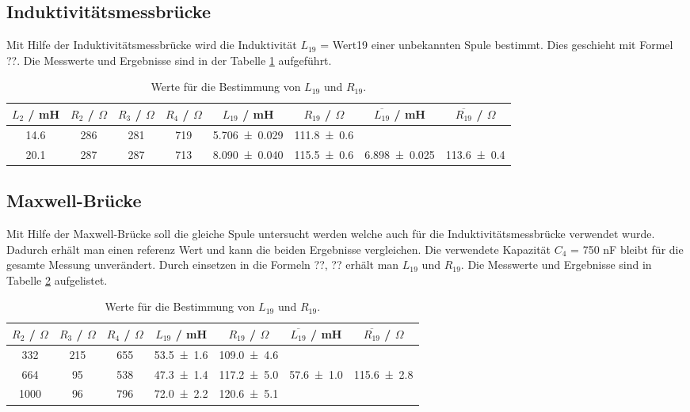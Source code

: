 \subsection{Induktivitätsmessbrücke}
Mit Hilfe der Induktivitätsmessbrücke wird die Induktivität $L_{19}$ = Wert19 einer unbekannten Spule bestimmt. Dies geschieht mit Formel ??. Die Messwerte und Ergebnisse sind in der Tabelle \ref{tab:Induk1} aufgeführt.
\begin{table}[H]
  \centering
  \begin{tabular}{c c c c c c c c}
    \toprule
    $L_2$ / mH & $R_2$ / $\Omega$ & $R_3$ / $\Omega$ & $R_4$ / $\Omega$ & $L_{19}$ / mH & $R_{19}$ / $\Omega$ & $\overline{L_{19}}$ / mH & $\overline{R_{19}}$ / $\Omega$ \\
    \midrule
    14.6 & 286 & 281 & 719 & \num{5.706 +- 0.029} & \num{111.8 +- 0.6} & & \\
    20.1 & 287 & 287 & 713 & \num{8.090 +- 0.040} & \num{115.5 +- 0.6} & \num{6.898 +- 0.025} & \num{113.6 +- 0.4} \\
  \end{tabular}
  \caption{Werte für die Bestimmung von $L_{19}$ und $R_{19}$.}
  \label{tab:Induk1}
\end{table}

\subsection{Maxwell-Brücke}
Mit Hilfe der Maxwell-Brücke soll die gleiche Spule untersucht werden welche auch für die Induktivitätsmessbrücke verwendet wurde. Dadurch erhält man einen referenz Wert und kann die beiden Ergebnisse vergleichen. Die verwendete Kapazität $C_4$ = 750 nF bleibt für die gesamte Messung unverändert. Durch einsetzen in die Formeln ??, ?? erhält man $L_{19}$ und $R_{19}$. Die Messwerte und Ergebnisse sind in Tabelle \ref{tab:Induk2} aufgelistet.

\begin{table}[H]
  \centering
  \begin{tabular}{c c c c c c c}
    \toprule
    $R_2$ / $\Omega$ & $R_3$ / $\Omega$ & $R_4$ / $\Omega$ & $L_{19}$ / mH & $R_{19}$ / $\Omega$ & $\overline{L_{19}}$ / mH & $\overline{R_{19}}$ / $\Omega$ \\
    \midrule
    332 & 215 & 655 & \num{53.5 +- 1.6} & \num{109.0 +- 4.6} & & \\
    664 & 95 & 538 & \num{47.3 +- 1.4} & \num{117.2 +- 5.0} & \num{57.6 +- 1.0} & \num{115.6 +- 2.8} \\
    1000 & 96 & 796 & \num{72.0 +- 2.2} & \num{120.6 +- 5.1} & & \\
  \end{tabular}
  \caption{Werte für die Bestimmung von $L_{19}$ und $R_{19}$.}
  \label{tab:Induk2}
\end{table}

